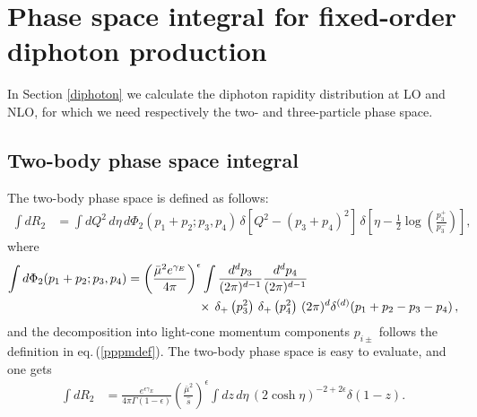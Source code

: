 \documentclass[11pt]{article}
\newcommand{\nn}{\nonumber}
\newcommand{\eps}{\epsilon}
\newcommand{\s}{\hat{s}}
\newcommand\eqn[1]     {eq.\,(\ref{#1})}
\begin{document}
\section{Phase space integral for fixed-order diphoton production}
\label{PSintegral}

In Section \ref{diphoton} we calculate the
diphoton rapidity distribution at LO and NLO,
for which we need respectively the two- and 
three-particle phase space. 
\subsection{Two-body phase space integral}\label{PSintegral2}
The two-body 
phase space is defined as follows:
\begin{align}\label{R2Def}
\int dR_2 &= \int dQ^2 \, d\eta \, d\Phi_2(p_1+p_2;p_3,p_4) 
\, \delta\left[Q^2-(p_3+p_4)^2\right] \, \delta\left[\eta
-\frac12\log\left(\frac{p_3^+}{p_3^-}\right)\right],
\end{align}
where 
\begin{align} \nn
\int d\Phi_2(p_1+p_2;p_3,p_4) &= 
\bigg(\frac{\bar \mu^2 e^{\gamma_E}}{4\pi}\bigg)^\eps 
\int \frac{d^dp_3}{(2\pi)^{d-1}}\frac{d^dp_4}{(2\pi)^{d-1}} \\ 
&\hspace{2.0cm} \times \, \delta_+\left(p_3^2\right) 
\, \delta_+\left(p_4^2\right) 
\, (2\pi)^d\delta^{(d)}(p_1+p_2-p_3-p_4)\,,
\end{align}
and the decomposition into light-cone momentum 
components $p_{i\pm}$ follows the definition in 
\eqn{pppmdef}. The two-body phase space is easy 
to evaluate, and one gets 
\begin{align}\label{R2Res}
\int dR_2 &= \frac{e^{\eps \gamma_E}}{4\pi\Gamma(1-\epsilon)}
\left(\frac{\bar \mu^2}{\s}\right)^\epsilon 
\int dz \, d\eta \, \left(2\cosh\eta\right)^{-2+2\epsilon}
\delta(1-z).
\end{align}
\end{document}
